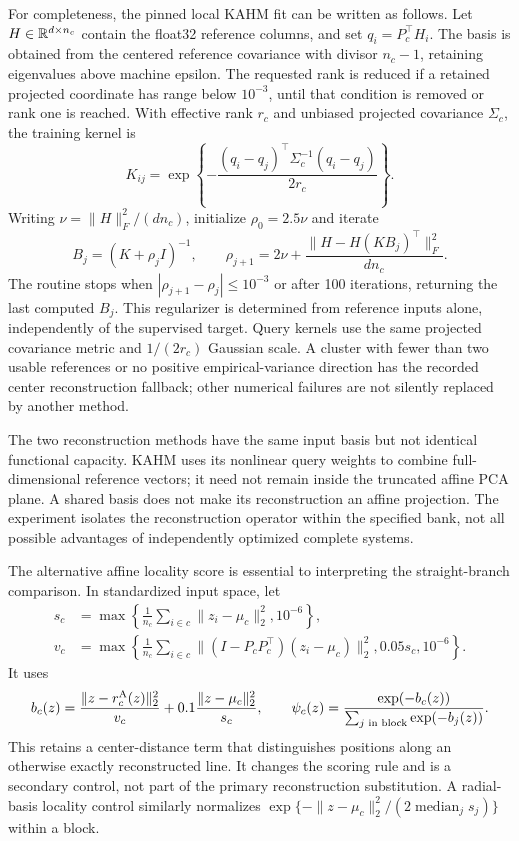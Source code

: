 For completeness, the pinned local KAHM fit can be written as follows.
Let $H\in\mathbb{R}^{d\times n_c}$ contain the float32 reference columns,
and set $q_i=P_c^\top H_i$. The basis is obtained from the centered
reference covariance with divisor $n_c-1$, retaining eigenvalues
above machine epsilon. The requested rank is reduced if a retained
projected coordinate has range below $10^{-3}$, until that condition
is removed or rank one is reached. With effective rank $r_c$ and
unbiased projected covariance $\Sigma_c$, the training kernel is
\[
 K_{ij}=\exp\left\{-\frac{(q_i-q_j)^\top\Sigma_c^{-1}(q_i-q_j)}{2r_c}\right\}.
\]
Writing $\nu=\|H\|_F^2/(dn_c)$, initialize $\rho_0=2.5\nu$ and iterate
\[
 B_j=(K+\rho_j I)^{-1},\qquad
 \rho_{j+1}=2\nu+
       \frac{\|H-H(KB_j)^\top\|_F^2}{dn_c}.
\]
The routine stops when $|\rho_{j+1}-\rho_j|\leq10^{-3}$ or after 100
iterations, returning the last computed $B_j$. This regularizer is
determined from reference inputs alone, independently of the supervised
target. Query kernels use the same projected covariance metric and
$1/(2r_c)$ Gaussian scale. A cluster with fewer than two usable
references or no positive empirical-variance direction has the recorded
center reconstruction fallback; other numerical failures are not
silently replaced by another method.

The two reconstruction methods have the same input basis but not
identical functional capacity. KAHM uses its nonlinear query weights
to combine full-dimensional reference vectors; it need not remain
inside the truncated affine PCA plane. A shared basis does not make
its reconstruction an affine projection. The experiment isolates the
reconstruction operator within the specified bank, not all possible
advantages of independently optimized complete systems.

The alternative affine locality score is essential to interpreting
the straight-branch comparison. In standardized input space, let
\begin{align*}
 s_c&=\max\left\{\frac1{n_c}\sum_{i\in c}\|z_i-\mu_c\|_2^2,10^{-6}\right\},\\
 v_c&=\max\left\{\frac1{n_c}\sum_{i\in c}
       \|(I-P_cP_c^\top)(z_i-\mu_c)\|_2^2,
       0.05s_c,10^{-6}\right\}.
\end{align*}
It uses
\[
 b_c(z)=\frac{\|z-r_c^{\mathrm{A}}(z)\|_2^2}{v_c}
               +0.1\frac{\|z-\mu_c\|_2^2}{s_c},\qquad
 \psi_c(z)=\frac{\exp(-b_c(z))}{\sum_{j\text{ in block}}\exp(-b_j(z))}.
\]
This retains a center-distance term that distinguishes positions along
an otherwise exactly reconstructed line. It changes the scoring rule
and is a secondary control, not part of the primary reconstruction
substitution. A radial-basis locality control similarly normalizes
$\exp\{-\|z-\mu_c\|_2^2/(2\operatorname{median}_j s_j)\}$ within a block.


